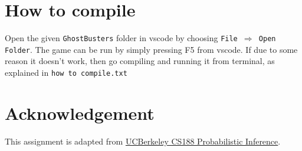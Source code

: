 \documentclass[a4paper,12pt]{article}
\begin{document}
		


\section{How to compile}
Open the given \texttt{GhostBusters} folder in vscode by choosing \texttt{File $\Rightarrow$ Open Folder}. The game can be run by simply pressing F5 from vscode. If due to some reason it doesn't work, then go compiling and running it from terminal, as explained in \texttt{how to compile.txt}


\section{Acknowledgement}
This assignment is adapted from \href{https://www.youtube.com/watch?v=sMNbLXsvRig}{UCBerkeley CS188 Probabilistic Inference}.	
	
	
\end{document}
